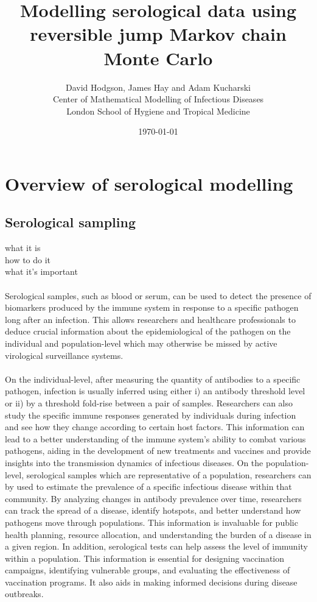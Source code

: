 \documentclass{article}
\title{Modelling serological data using reversible jump Markov chain Monte Carlo}
\author{David Hodgson, James Hay and Adam Kucharski\\\small Center of Mathematical Modelling of Infectious Diseases\\\small London School of Hygiene and Tropical Medicine}
\date{\today}
\begin{document}
\maketitle

\section{Overview of serological modelling}

\subsection{Serological sampling}
what it is\\
how to do it\\
what it's important

\paragraph{}Serological samples, such as blood or serum, can be used to detect the presence of biomarkers produced by the immune system in response to a specific pathogen long after an infection. This allows researchers and healthcare professionals to deduce crucial information about the epidemiological of the pathogen on the individual and population-level which may otherwise be missed by active virological surveillance systems.

\paragraph{}On the individual-level, after measuring the quantity of antibodies to a specific pathogen, infection is usually inferred using either i) an antibody threshold level or ii) by a threshold fold-rise between a pair of samples. Researchers can also study the specific immune responses generated by individuals during infection and see how they change according to certain host factors. This information can lead to a better understanding of the immune system's ability to combat various pathogens, aiding in the development of new treatments and vaccines and  provide insights into the transmission dynamics of infectious diseases. On the population-level, serological samples which are representative of a population, researchers can by used to estimate the prevalence of a specific infectious disease within that community. By analyzing changes in antibody prevalence over time, researchers can track the spread of a disease, identify hotspots, and better understand how pathogens move through populations. This information is invaluable for public health planning, resource allocation, and understanding the burden of a disease in a given region. In addition, serological tests can help assess the level of immunity within a population. This information is essential for designing vaccination campaigns, identifying vulnerable groups, and evaluating the effectiveness of vaccination programs. It also aids in making informed decisions during disease outbreaks.
\end{document}
